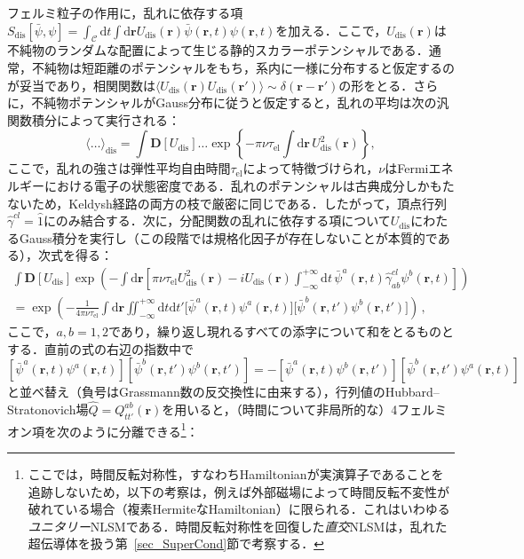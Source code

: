 \documentclass[a4paper,11pt]{ltjsarticle}
\def\d{\mathrm{d}}
\def\D{\mathbf{D}}
\def\rt{(\mathbf{r},t)}
\def\rtp{(\mathbf{r},t')}
\def\tauel{\tau_{\mathrm{el}}}
\begin{document}
フェルミ粒子の作用に，乱れに依存する項$S_{\mathrm{dis}}[\bar{\psi},\psi]=\int_{\mathcal{C}}\d
t\int\d\mathbf{r}U_{\mathrm{dis}}(\mathbf{r}) \bar{\psi}\rt\psi\rt$を加える．ここで，$U_{\mathrm{dis}}(\mathbf{r})$は不純物のランダムな配置によって生じる静的スカラーポテンシャルである．通常，不純物は短距離のポテンシャルをもち，系内に一様に分布すると仮定するのが妥当であり，相関関数は$\langle
U_{\mathrm{dis}}(\mathbf{r})U_{\mathrm{dis}}(\mathbf{r}')\rangle\sim
\delta(\mathbf{r}-\mathbf{r}')$の形をとる．さらに，不純物ポテンシャルがGauss分布に従うと仮定すると，乱れの平均は次の汎関数積分によって実行される：
\begin{equation}\label{NLSM-dis-average-def}
\langle\ldots\rangle_{\mathrm{dis}}=\int\D[U_{\mathrm{dis}}] \ldots
\exp\left\{-\pi\nu\tauel\int\d\mathbf{r}\,U^{2}_{\mathrm{dis}}(\mathbf{r})\right\},
\end{equation}
ここで，乱れの強さは弾性平均自由時間$\tauel$によって特徴づけられ，$\nu$はFermiエネルギーにおける電子の状態密度である．乱れのポテンシャルは古典成分しかもたないため，Keldysh経路の両方の枝で厳密に同じである．したがって，頂点行列$\hat{\gamma}^{cl}=\hat
1$にのみ結合する．次に，分配関数の乱れに依存する項について$U_{\mathrm{dis}}$にわたるGauss積分を実行し（この段階では規格化因子が存在しないことが本質的である），次式を得る：
\begin{eqnarray}\label{NLSM-dis-average}
\int\D[U_{\mathrm{dis}}]\exp\left(-\int\d\mathbf{r}\left[\pi\nu\tauel
U^{2}_{\mathrm{dis}}(\mathbf{r})-iU_{\mathrm{dis}}(\mathbf{r})\int^{+\infty}_{-\infty}
\d t\, \bar{\psi}^{a}\rt\hat
\gamma^{cl}_{ab}\psi^{b}\rt\right]\right)\nonumber
\\ =\exp\left(-\frac{1}{4\pi\nu\tauel}\int\d\mathbf{r}
\iint^{+\infty}_{-\infty}\d t\d t'
\big[\bar{\psi}^{a}\rt\psi^{a}\rt\big]
\big[\bar{\psi}^{b}\rtp\psi^{b}\rtp\big]\right)\,,
\end{eqnarray}
ここで，$a,b=1,2$であり，繰り返し現れるすべての添字について和をとるものとする．直前の式の右辺の指数中で$[\bar{\psi}^a\rt\psi^{a}\rt][
\bar{\psi}^{b}\rtp\psi^{b}\rtp]=-[\bar{\psi}^{a}\rt
\psi^{b}\rtp][\bar{\psi}^{b}\rtp\psi^{a}\rt]$と並べ替え（負号はGrassmann数の反交換性に由来する），行列値のHubbard--Stratonovich場$\hat{Q}=Q^{ab}_{tt'}(\mathbf{r})$を用いると，（時間について非局所的な）4フェルミオン項を次のように分離できる\footnote{ここでは，時間反転対称性，すなわちHamiltonianが実演算子であることを追跡しないため，以下の考察は，例えば外部磁場によって時間反転不変性が破れている場合（複素HermiteなHamiltonian）に限られる．これはいわゆる{\em ユニタリー}NLSMである．時間反転対称性を回復した{\em 直交}NLSMは，乱れた超伝導体を扱う第~\ref{sec_SuperCond}節で考察する．}：
\end{document}
